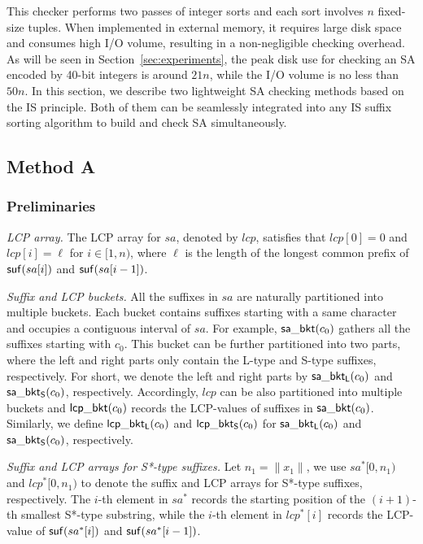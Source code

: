 \documentclass[10pt,journal,compsoc]{IEEEtran}
\begin{document}
This checker performs two passes of integer sorts and each sort involves $n$ fixed-size tuples. When implemented in external memory, it requires large disk space and consumes high I/O volume, resulting in a non-negligible checking overhead. As will be seen in Section~\ref{sec:experiments}, the peak disk use for checking an SA encoded by 40-bit integers is around $21n$, while the I/O volume is no less than $50n$. In this section, we describe two lightweight SA checking methods based on the IS principle. Both of them can be seamlessly integrated into any IS suffix sorting algorithm to build and check SA simultaneously.  

\subsection{Method A} \label{sec:checkers:method_a}

\subsubsection{Preliminaries} \label{sec:checkers:method_a:preliminaries}

{\em LCP array.} The LCP array for $sa$, denoted by $lcp$, satisfies that $lcp[0] = 0$ and $lcp[i] = \ell$ for $i \in [1, n)$, where $\ell$ is the length of the longest common prefix of ${\sf suf}(sa[i])$ and ${\sf suf}(sa[i - 1])$.

{\em Suffix and LCP buckets.} All the suffixes in $sa$ are naturally partitioned into multiple buckets. Each bucket contains suffixes starting with a same character and occupies a contiguous interval of $sa$. For example, ${\sf sa\_bkt}(c_0)$ gathers all the suffixes starting with $c_0$. This bucket can be further partitioned into two parts, where the left and right parts only contain the L-type and S-type suffixes, respectively. For short, we denote the left and right parts by ${\sf sa\_bkt_L}(c_0)$ and ${\sf sa\_bkt_S}(c_0)$, respectively. Accordingly, $lcp$ can be also partitioned into multiple buckets and ${\sf lcp\_bkt}(c_0)$ records the LCP-values of suffixes in ${\sf sa\_bkt}(c_0)$. Similarly, we define ${\sf lcp\_bkt_L}(c_0)$ and ${\sf lcp\_bkt_S}(c_0)$ for ${\sf sa\_bkt_L}(c_0)$ and ${\sf sa\_bkt_S}(c_0)$, respectively.

{\em Suffix and LCP arrays for S*-type suffixes.} Let $n_1 = \|x_1\|$, we use $sa^*[0, n_1)$ and $lcp^*[0, n_1)$ to denote the suffix and LCP arrays for S*-type suffixes, respectively. The $i$-th element in $sa^*$ records the starting position of the $(i + 1)$-th smallest S*-type substring, while the $i$-th element in $lcp^*[i]$ records the LCP-value of ${\sf suf}(sa^*[i])$ and ${\sf suf}(sa^*[i - 1])$.
\end{document}
